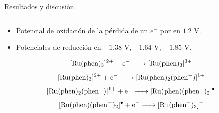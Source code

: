 \documentclass[handout]{beamer}
\begin{document}
\begin{frame}{Resultados y discusi\'on}
	\begin{columns}
		\footnotesize
		\begin{column}{0.6\textwidth}
			\begin{itemize}
				\item Potencial de oxidaci\'on de la p\'erdida de un $e^-$ por  en $1.2$ V.
				\item Potenciales de reducci\'on en $-1.38$ V, $-1.64$ V, $-1.85$ V.
			\end{itemize}
		\tiny
		\vspace{0.5cm}
		\begin{equation}
			\ce{[Ru(phen)3]^{2+} - e^- -> [Ru(phen)3]^{3+}}
		\end{equation}
		\begin{equation}
			\ce{[Ru(phen)3]^{2+} + e^- -> [Ru(phen)2(phen^-)]^{1+}}
		\end{equation}
		\begin{equation}
			\ce{[Ru(phen)2(phen^-)]^{1+} + e^- -> [Ru(phen)(phen^-)2]^{\bullet}}
		\end{equation}
		\begin{equation}
			\ce{[Ru(phen)(phen^-)2]^{\bullet} + e^- -> [Ru(phen^-)3]^{-}}
		\end{equation}		
		

\end{column}
\end{columns}
\end{frame}
\end{document}
